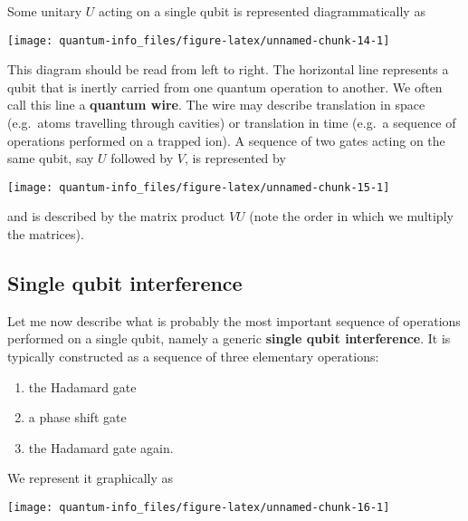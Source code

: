 \documentclass[fleqn]{article}
\providecommand{\tightlist}{%
  \setlength{\itemsep}{0pt}\setlength{\parskip}{0pt}}
\begin{document}
Some unitary \(U\) acting on a single qubit is represented diagrammatically as

\begin{center}\texttt{[image: quantum-info\_files/figure-latex/unnamed-chunk-14-1]} \end{center}

This diagram should be read from left to right.
The horizontal line represents a qubit that is inertly carried from one quantum operation to another.
We often call this line a \textbf{quantum wire}.
The wire may describe translation in space (e.g.~atoms travelling through cavities) or translation in time (e.g.~a sequence of operations performed on a trapped ion).
A sequence of two gates acting on the same qubit, say \(U\) followed by \(V\), is represented by

\begin{center}\texttt{[image: quantum-info\_files/figure-latex/unnamed-chunk-15-1]} \end{center}

and is described by the matrix product \(VU\) (note the order in which we multiply the matrices).

\hypertarget{single-qubit-interference}{%
\subsection{Single qubit interference}\label{single-qubit-interference}}

Let me now describe what is probably the most important sequence of operations performed on a single qubit, namely a generic \textbf{single qubit interference}.
It is typically constructed as a sequence of three elementary operations:

\begin{enumerate}
\def\labelenumi{\arabic{enumi}.}
\tightlist
\item
  the Hadamard gate
\item
  a phase shift gate
\item
  the Hadamard gate again.
\end{enumerate}

We represent it graphically as

\begin{center}\texttt{[image: quantum-info\_files/figure-latex/unnamed-chunk-16-1]} \end{center}
\end{document}
